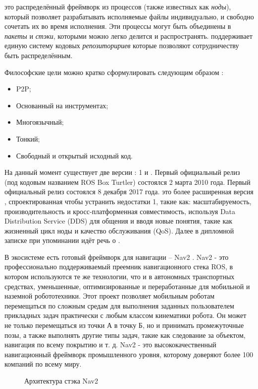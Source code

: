 \ros{} это распределённый фреймворк из процессов (также известных как
\textit{ноды}), который позволяет разрабатывать исполняемые файлы индивидуально,
и свободно сочетать их во время исполнения. Эти процессы могут быть объединены в
\textit{пакеты} и \textit{стэки}, которыми можно легко делится и распространять.
\ros{} поддерживает единую систему кодовых \textit{репозиторириев} которые
позволяют сотрудничеству быть распределённым.

Философские цели \ros{} можно кратко сформулировать следующим образом
 \cite{quigley2009ros}:
\begin{itemize}
	\item P2P;
	\item Основанный на инструментах;
	\item Многоязычный;
	\item Тонкий;
	\item Свободный и открытый исходный код.
\end{itemize}

На данный момент существует две версии \ros{}: \ros{} 1 и \rosTwo{}. Первый
официальный релиз \ros{} (под кодовым названием ROS Box Turtler) состоялся 2
марта 2010 года. Первый официальный релиз \rosTwo{} состоялся 8 декабря 2017
года. \rosTwo{} это более расширенная версия \ros{}, спроектированная чтобы
устранить недостатки \ros{} 1, такие как: масштабируемость, производительность и
кросс-платформенная совместимость, используя Data Distribution Service (DDS) для
общения и вводя новые понятия, такие как жизненный цикл ноды и качество
обслуживания (QoS). Далее в дипломной записке при упоминании \ros{} идёт речь о
\rosTwo{}.

В экосистеме \ros{} есть готовый фреймворк для навигации -- Nav2
\cite{macenski2020marathon2}. Nav2 - это профессионально поддерживаемый преемник
навигационного стека ROS, в котором используются те же технологии, что и в
автономных транспортных средствах, уменьшенные, оптимизированные и
переработанные для мобильной и наземной робототехники. Этот проект позволяет
мобильным роботам перемещаться по сложным средам для выполнения заданных
пользователем прикладных задач практически с любым классом кинематики робота. Он
может не только перемещаться из точки А в точку Б, но и принимать промежуточные
позы, а также выполнять другие типы задач, такие как следование за объектом,
навигация по всему покрытию и т. д. Nav2 - это высококачественный навигационный
фреймворк промышленного уровня, которому доверяют более 100 компаний по
всему миру.


\begin{figure}[h]
\centering
\caption{Архитектура стэка Nav2}
\end{figure}

